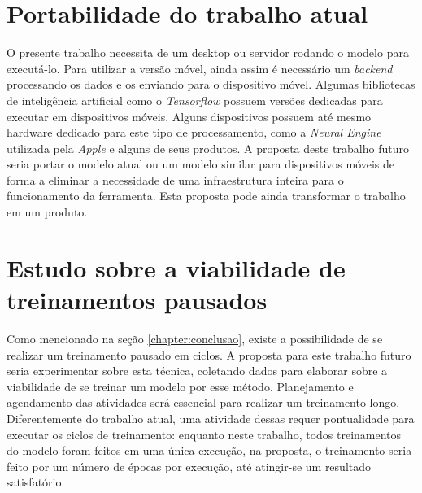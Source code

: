 \section{Portabilidade do trabalho atual}
\label{sec:trabalhos-futuros:portabilidade}

O presente trabalho necessita de um desktop ou servidor rodando o modelo para executá-lo. Para utilizar a versão móvel, ainda assim é necessário um \textit{backend} processando os dados e os enviando para o dispositivo móvel. Algumas bibliotecas de inteligência artificial como o \textit{Tensorflow} possuem versões dedicadas para executar em dispositivos móveis. Alguns dispositivos possuem até mesmo hardware dedicado para este tipo de processamento, como a \textit{Neural Engine} utilizada pela \textit{Apple} e alguns de seus produtos. A proposta deste trabalho futuro seria portar o modelo atual ou um modelo similar para dispositivos móveis de forma a eliminar a necessidade de uma infraestrutura inteira para o funcionamento da ferramenta. Esta proposta pode ainda transformar o trabalho em um produto.

\section{Estudo sobre a viabilidade de treinamentos pausados}
\label{sec:trabalhos-futuros:treinamento-pausado}

Como mencionado na seção \ref{chapter:conclusao}, existe a possibilidade de se realizar um treinamento pausado em ciclos. A proposta para este trabalho futuro seria experimentar sobre esta técnica, coletando dados para elaborar sobre a viabilidade de se treinar um modelo por esse método. Planejamento e agendamento das atividades será essencial para realizar um treinamento longo. Diferentemente do trabalho atual, uma atividade dessas requer pontualidade para executar os ciclos de treinamento: enquanto neste trabalho, todos treinamentos do modelo foram feitos em uma única execução, na proposta, o treinamento seria feito por um número de épocas por execução, até atingir-se um resultado satisfatório.

